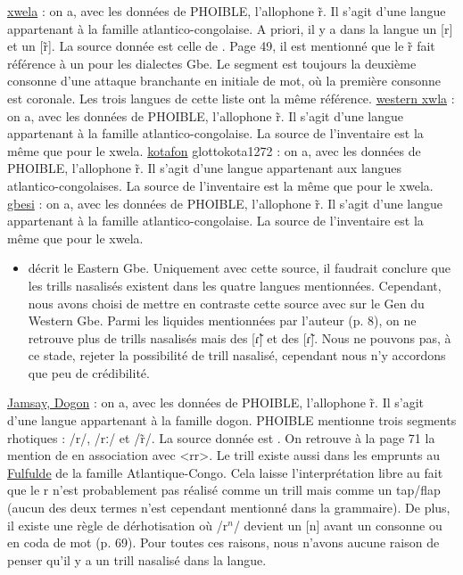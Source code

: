 \begin{exe}
\begin{xlist}
	\ex \href{https://phoible.org/inventories/view/1279}{xwela}  : on a, avec les données de PHOIBLE, l'allophone r̃. Il s'agit d'une langue appartenant à la famille atlantico-congolaise. A priori, il y a dans la langue un [r] et un [r̃]. La source donnée est celle de \textcite{capoComparativePhonologyGbe1991}. Page 49, il est mentionné que le r̃ fait référence à un  pour les dialectes Gbe. Le segment est toujours la deuxième consonne d'une attaque branchante en initiale de mot, où la première consonne est coronale. Les trois langues de cette liste ont la même référence.
	\ex \href{https://phoible.org/inventories/view/1280}{western xwla}  : on a, avec les données de PHOIBLE, l'allophone r̃. Il s'agit d'une langue appartenant à la famille atlantico-congolaise. La source de l'inventaire est la même que pour le xwela.
	\ex \href{https://phoible.org/inventories/view/1281}{kotafon} glotto{kota1272} : on a, avec les données de PHOIBLE, l'allophone r̃. Il s'agit d'une langue appartenant aux langues atlantico-congolaises. La source de l'inventaire est la même que pour le xwela.
	\ex \href{https://phoible.org/inventories/view/1282}{gbesi}  : on a, avec les données de PHOIBLE, l'allophone r̃. Il s'agit d'une langue appartenant à la famille atlantico-congolaise. La source de l'inventaire est la même que pour le xwela.
	\begin{itemize}
		\item \textcite{capoComparativePhonologyGbe1991} décrit le Eastern Gbe. Uniquement avec cette source, il faudrait conclure que les trills nasalisés existent dans les quatre langues mentionnées. Cependant, nous avons choisi de mettre en contraste cette source avec  \textcite{lotvenSoundSystemSketch2020} sur le Gen du Western Gbe. Parmi les liquides mentionnées par l'auteur (p. 8), on ne retrouve plus de trills nasalisés mais des [ɾ̃] et des [ɾ̃]. Nous ne pouvons pas, à ce stade, rejeter la possibilité de trill nasalisé, cependant nous n'y accordons que peu de crédibilité.
	\end{itemize}
	\ex \href{https://phoible.org/inventories/view/1442}{Jamsay, Dogon}  : on a, avec les données de PHOIBLE, l'allophone r̃. Il s'agit d'une langue appartenant à la famille dogon. PHOIBLE mentionne trois segments rhotiques : /r/, /rː/ et /r̃/. La source donnée est \textcite[34]{heathGrammarJamsay2008}. On retrouve à la page 71 la mention de  en association avec <rr>. Le trill existe aussi dans les emprunts au \href{https://glottolog.org/resource/languoid/id/fula1264}{Fulfulde} de la famille Atlantique-Congo. Cela laisse l'interprétation libre au fait que le r n'est probablement pas réalisé comme un trill mais comme un tap/flap (aucun des deux termes n'est cependant mentionné dans la grammaire). De plus, il existe une règle de dérhotisation où /r$^{n}$/ devient un [n] avant un consonne ou en coda de mot (p. 69). Pour toutes ces raisons, nous n'avons aucune raison de penser qu'il y a un trill nasalisé dans la langue.
	

\end{xlist}
\end{exe}
